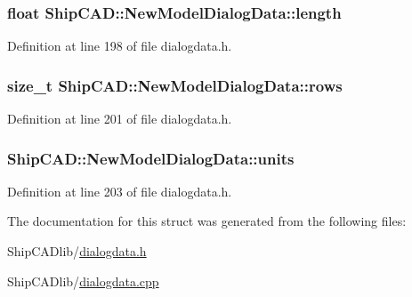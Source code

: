 \subsubsection[{\texorpdfstring{length}{length}}]{\setlength{\rightskip}{0pt plus 5cm}float Ship\+C\+A\+D\+::\+New\+Model\+Dialog\+Data\+::length}\hypertarget{structShipCAD_1_1NewModelDialogData_ad81a20ab469df5a0f65149f967415d31}{}\label{structShipCAD_1_1NewModelDialogData_ad81a20ab469df5a0f65149f967415d31}


Definition at line 198 of file dialogdata.\+h.

\subsubsection[{\texorpdfstring{rows}{rows}}]{\setlength{\rightskip}{0pt plus 5cm}size\+\_\+t Ship\+C\+A\+D\+::\+New\+Model\+Dialog\+Data\+::rows}\hypertarget{structShipCAD_1_1NewModelDialogData_aa1624f2018fd39dbbe80bc10e70efa8b}{}\label{structShipCAD_1_1NewModelDialogData_aa1624f2018fd39dbbe80bc10e70efa8b}


Definition at line 201 of file dialogdata.\+h.

\subsubsection[{\texorpdfstring{units}{units}}]{ Ship\+C\+A\+D\+::\+New\+Model\+Dialog\+Data\+::units}\hypertarget{structShipCAD_1_1NewModelDialogData_a8ff4b02ff5c3ce20c0b0d3bdade551a7}{}\label{structShipCAD_1_1NewModelDialogData_a8ff4b02ff5c3ce20c0b0d3bdade551a7}


Definition at line 203 of file dialogdata.\+h.



The documentation for this struct was generated from the following files\+:\begin{DoxyCompactItemize}
\item 
Ship\+C\+A\+Dlib/\hyperlink{dialogdata_8h}{dialogdata.\+h}\item 
Ship\+C\+A\+Dlib/\hyperlink{dialogdata_8cpp}{dialogdata.\+cpp}\end{DoxyCompactItemize}
